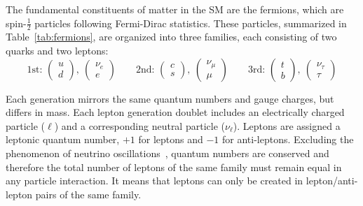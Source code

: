 The fundamental constituents of matter in the SM are the fermions, which are spin-$\frac{1}{2}$ particles following Fermi-Dirac statistics. These particles, summarized in Table~\ref{tab:fermions}, are organized into three families, each consisting of two quarks and two leptons: 
\begin{equation}
\text{1st: } \left( \begin{matrix} u \\ d \end{matrix} \right),\ \left( \begin{matrix} \nu_e \\ e \end{matrix} \right) \qquad
\text{2nd: } \left( \begin{matrix} c \\ s \end{matrix} \right),\ \left( \begin{matrix} \nu_\mu \\ \mu \end{matrix} \right) \qquad
\text{3rd: } \left( \begin{matrix} t \\ b \end{matrix} \right),\ \left( \begin{matrix} \nu_\tau \\ \tau \end{matrix} \right)
\end{equation}

Each generation mirrors the same quantum numbers and gauge charges, but differs in mass. Each lepton generation doublet includes an electrically charged particle ($\ell$) and a corresponding neutral particle ($\nu_{\ell}$). Leptons are assigned a leptonic quantum number, $+1$ for leptons and $-1$ for anti-leptons. Excluding the phenomenon of neutrino oscillations~\cite{neutrino1,neutrino2}, quantum numbers are conserved and therefore the total number of leptons of the same family must remain equal in any particle interaction. It means that leptons can only be created in lepton/anti-lepton pairs of the same family. 

